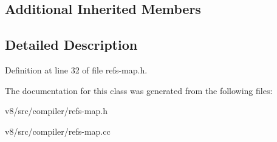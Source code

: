 \subsection*{Additional Inherited Members}


\subsection{Detailed Description}


Definition at line 32 of file refs-\/map.\+h.



The documentation for this class was generated from the following files\+:\begin{DoxyCompactItemize}
\item 
v8/src/compiler/refs-\/map.\+h\item 
v8/src/compiler/refs-\/map.\+cc\end{DoxyCompactItemize}
